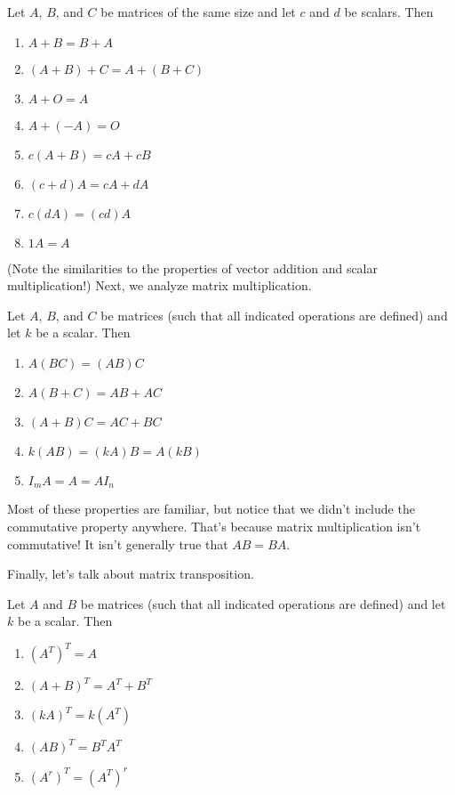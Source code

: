 \documentclass[../m073main.tex]{subfiles}
\begin{document}
\begin{theorem}
	Let $A$, $B$, and $C$ be matrices of the same size and let $c$ and $d$ be scalars.
	Then
	\begin{enumerate}[label=(\alph*)]
		\item $A + B = B + A$
		\item $(A + B) + C = A + (B + C)$
		\item $A + O = A$
		\item $A + (-A) = O$
		\item $c(A + B) = cA + cB$
		\item $(c+d)A = cA + dA$
		\item $c(dA) = (cd)A$
		\item $1A = A$
	\end{enumerate}
\end{theorem}

(Note the similarities to the properties of vector addition and scalar multiplication!)
Next, we analyze matrix multiplication.

\begin{theorem}
	Let $A$, $B$, and $C$ be matrices (such that all indicated operations are defined) and let $k$ be a scalar.
	Then
	\begin{enumerate}[label=(\alph*)]
		\item $A(BC) = (AB)C$
		\item $A(B+C) = AB+AC$
		\item $(A+B)C = AC+BC$
		\item $k(AB) = (kA)B = A(kB)$
		\item $I_mA = A = AI_n$
	\end{enumerate}
\end{theorem}

Most of these properties are familiar, but notice that we didn't include the commutative property anywhere.
That's because matrix multiplication isn't commutative!
It isn't generally true that $AB = BA$.

Finally, let's talk about matrix transposition.

\begin{theorem}
	Let $A$ and $B$ be matrices (such that all indicated operations are defined) and let $k$ be a scalar.
	Then
	\begin{enumerate}[label=(\alph*)]
		\item $(A^T)^T = A$
		\item $(A+B)^T = A^T + B^T$
		\item $(kA)^T = k(A^T)$
		\item $(AB)^T = B^TA^T$
		\item $(A^r)^T = (A^T)^r$
	\end{enumerate}
\end{theorem}
\end{document}
